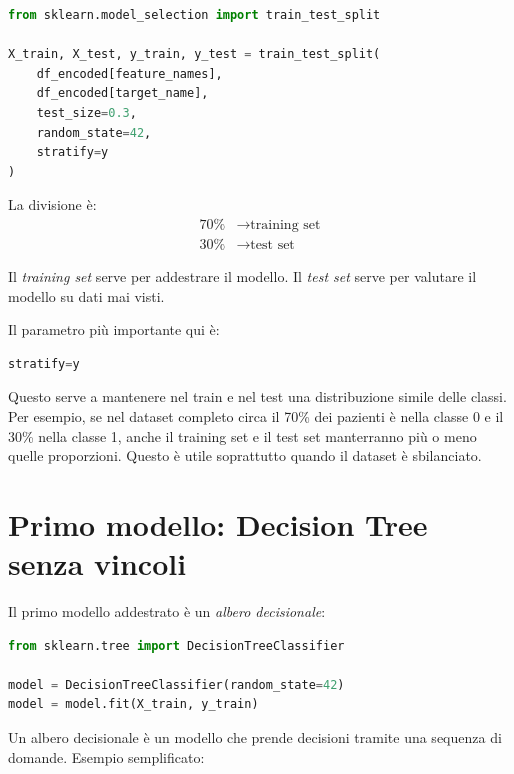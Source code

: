 \documentclass[11pt,a4paper]{article}
\begin{document}
\begin{lstlisting}[language=Python]
from sklearn.model_selection import train_test_split

X_train, X_test, y_train, y_test = train_test_split(
    df_encoded[feature_names],
    df_encoded[target_name],
    test_size=0.3,
    random_state=42,
    stratify=y
)
\end{lstlisting}

La divisione è:
\begin{align*}
    70\% &\rightarrow \text{training set} \\
    30\% &\rightarrow \text{test set}
\end{align*}

Il \textit{training set} serve per addestrare il modello. Il \textit{test set} serve per valutare il modello su dati mai visti.

Il parametro più importante qui è:
\begin{lstlisting}[language=Python]
stratify=y
\end{lstlisting}

Questo serve a mantenere nel train e nel test una distribuzione simile delle classi. Per esempio, se nel dataset completo circa il 70\% dei pazienti è nella classe 0 e il 30\% nella classe 1, anche il training set e il test set manterranno più o meno quelle proporzioni. Questo è utile soprattutto quando il dataset è sbilanciato.

\section{Primo modello: Decision Tree senza vincoli}
Il primo modello addestrato è un \textit{albero decisionale}:

\begin{lstlisting}[language=Python]
from sklearn.tree import DecisionTreeClassifier

model = DecisionTreeClassifier(random_state=42)
model = model.fit(X_train, y_train)
\end{lstlisting}

Un albero decisionale è un modello che prende decisioni tramite una sequenza di domande. Esempio semplificato:
\end{document}
